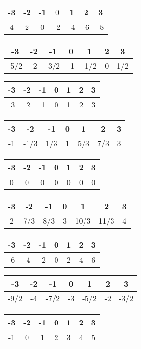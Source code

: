 \documentclass[12pt]{article}
\theoremstyle{note}
\begin{document}
\begin{flushleft}
\begin{tabular}{c|c|c|c|c|c|c}
-3&-2&-1&0&1&2&3\\ \hline 
4&2&0&-2&-4&-6&-8\end{tabular} 

 \vspace{0.5cm}\begin{tabular}{c|c|c|c|c|c|c}
-3&-2&-1&0&1&2&3\\ \hline 
-5/2&-2&-3/2&-1&-1/2&0&1/2\end{tabular} 

 \vspace{0.5cm}\begin{tabular}{c|c|c|c|c|c|c}
-3&-2&-1&0&1&2&3\\ \hline 
-3&-2&-1&0&1&2&3\end{tabular} 

 \vspace{0.5cm}\begin{tabular}{c|c|c|c|c|c|c}
-3&-2&-1&0&1&2&3\\ \hline 
-1&-1/3&1/3&1&5/3&7/3&3\end{tabular} 

 \vspace{0.5cm}\begin{tabular}{c|c|c|c|c|c|c}
-3&-2&-1&0&1&2&3\\ \hline 
0&0&0&0&0&0&0\end{tabular} 

 \vspace{0.5cm}\begin{tabular}{c|c|c|c|c|c|c}
-3&-2&-1&0&1&2&3\\ \hline 
2&7/3&8/3&3&10/3&11/3&4\end{tabular} 

 \vspace{0.5cm}\begin{tabular}{c|c|c|c|c|c|c}
-3&-2&-1&0&1&2&3\\ \hline 
-6&-4&-2&0&2&4&6\end{tabular} 

 \vspace{0.5cm}\begin{tabular}{c|c|c|c|c|c|c}
-3&-2&-1&0&1&2&3\\ \hline 
-9/2&-4&-7/2&-3&-5/2&-2&-3/2\end{tabular} 

 \vspace{0.5cm}\begin{tabular}{c|c|c|c|c|c|c}
-3&-2&-1&0&1&2&3\\ \hline 
-1&0&1&2&3&4&5\end{tabular} 


\end{flushleft}
\end{document}
